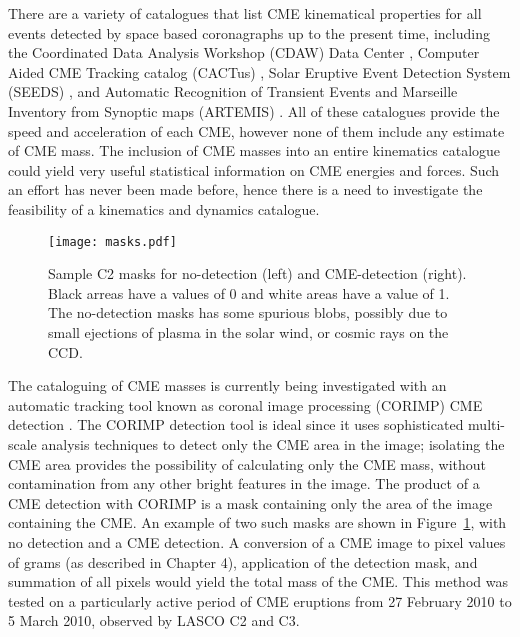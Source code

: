 There are a variety of catalogues that list CME kinematical properties for all events detected by space based coronagraphs up to the present time, including the Coordinated Data Analysis Workshop (CDAW) Data Center \citep{gopal2009b}, Computer Aided CME Tracking catalog (CACTus) \citep{robb2004}, Solar Eruptive Event Detection System (SEEDS) \citep{olmedo2008}, and  Automatic Recognition of Transient Events and Marseille Inventory from Synoptic maps (ARTEMIS) \citep{boursier2009}. All of these catalogues provide the speed and acceleration of each CME, however none of them include any estimate of CME mass. The inclusion of CME masses into an entire kinematics catalogue could yield very useful statistical information on CME energies and forces. Such an effort has never been made before, hence there is a need to investigate the feasibility of a kinematics and dynamics catalogue.
\begin{figure}[t!]
\begin{center}
\texttt{[image: masks.pdf]}
\caption[CORIMP masks]{Sample C2 masks for no-detection (left) and CME-detection (right). Black arreas have a values of 0 and white areas have a value of 1. The no-detection masks has some spurious blobs, possibly due to small ejections of plasma in the solar wind, or cosmic rays on the CCD.}
\label{fig:masks}
\end{center}
\end{figure}

The cataloguing of CME masses is currently being investigated with an automatic tracking tool known as coronal image processing (CORIMP) CME detection \citep{byrne2012}. The CORIMP detection tool is ideal since it uses sophisticated multi-scale analysis techniques to detect only the CME area in the image; isolating the CME area provides the possibility of calculating only the CME mass, without contamination from any other bright features in the image. The product of a CME detection with CORIMP is a mask containing only the area of the image containing the CME. An example of two such masks are shown in Figure~\ref{fig:masks}, with no detection and a CME detection. A conversion of a CME image to pixel values of grams (as described in Chapter 4), application of the detection mask, and summation of all pixels would yield the total mass of the CME. This method was tested on a particularly active period of CME eruptions from 27 February 2010 to 5 March 2010, observed by LASCO C2 and C3. 

